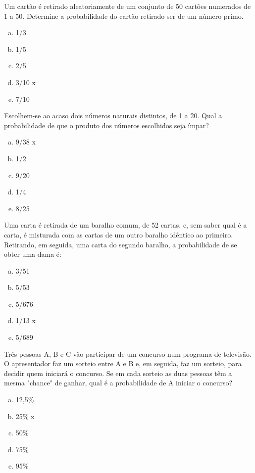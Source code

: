 \item Um cartão é retirado aleatoriamente de um conjunto de 50 cartões numerados de 1 a 50. Determine a probabilidade do cartão retirado ser de um número primo.
\begin{multicols}{5}
\begin{enumerate}[a)]
	\item 1/3 
	\item 1/5
	\item 2/5
	\item 3/10  x
	\item 7/10
\end{enumerate}
\end{multicols}

\item Escolhem-se ao acaso dois números naturais distintos, de 1 a 20. Qual a probabilidade de que o produto dos números escolhidos seja ímpar?
\begin{multicols}{5}
\begin{enumerate}[a)]
	\item 9/38  x
	\item 1/2
	\item 9/20  
	\item 1/4
	\item 8/25
\end{enumerate}
\end{multicols}

\item Uma carta é retirada de um baralho comum, de 52 cartas, e, sem saber qual é a carta, é misturada com as cartas de um outro baralho idêntico ao primeiro. Retirando, em seguida, uma carta do segundo baralho, a probabilidade de se obter uma dama é:
\begin{multicols}{5}
\begin{enumerate}[a)]
	\item 3/51
	\item 5/53
	\item 5/676
	\item 1/13  x
	\item 5/689 
\end{enumerate}
\end{multicols}

\item Três pessoas A, B e C vão participar de um concurso num programa de televisão. O apresentador faz um sorteio entre A e B e, em seguida, faz um sorteio, para decidir quem iniciará o concurso. Se em cada sorteio as duas pessoas têm a mesma "chance" de ganhar, qual é a probabilidade de A iniciar o concurso?
\begin{multicols}{5}
\begin{enumerate}[a)]
	\item 12,5\%
	\item 25\%  x
	\item 50\%
	\item 75\%
	\item 95\%
\end{enumerate}
\end{multicols}

